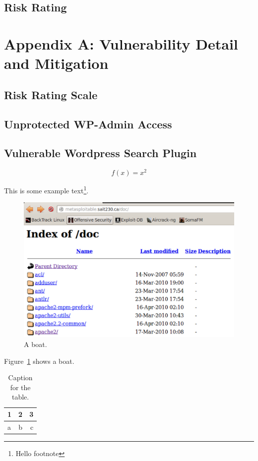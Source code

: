 \documentclass{article}
\begin{document}
\subsection{Risk Rating}

\newpage
\section{Appendix A: Vulnerability Detail and Mitigation}
\subsection{Risk Rating Scale}
\subsection{Unprotected WP-Admin Access}
\subsection{Vulnerable Wordpress Search Plugin}

\begin{equation*}
	f(x) = x^2
\end{equation*}

This is some example text\footnote{\label{myfootnote}Hello footnote}.

\begin{figure}[h!]
	\includegraphics[width=\linewidth]{images/screenshot.png}
	\caption{A boat.}
	\label{fig:boat1}
\end{figure}

Figure~\ref{fig:boat1} shows a boat.

\begin{table}[h!]
	\centering
	\caption{Caption for the table.}
	\label{tab:table1}
	\begin{tabular}{l|c||r}
		1 & 2 & 3\\
		\hline
		a & b & c\\
	\end{tabular}
\end{table}
\end{document}
